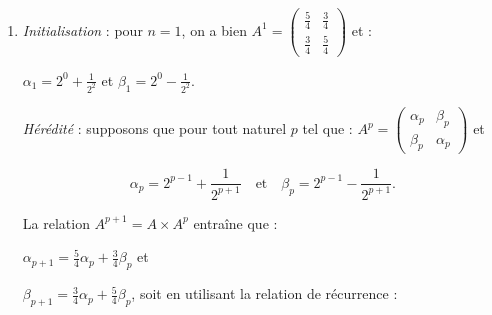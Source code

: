 \documentclass[10pt]{article}
\begin{document}
%
%
%
%

\begin{enumerate}
\item %

\emph{Initialisation} : pour $n = 1$, on a bien $A^1 = \begin{pmatrix}\frac{5}{4}&\frac{3}{4}\\\frac{3}{4}&\frac{5}{4} \end{pmatrix}$ et :

$\alpha_{1} = 2^0 + \frac{1}{2^2}$ et $\beta_{1} =  2^0 - \frac{1}{2^2}$.

\emph{Hérédité} : supposons que pour  tout  naturel $p$ tel que : $A^p = \begin{pmatrix}\alpha_{p}&\beta_{p}\\ \beta_{p}&\alpha_{p} \end{pmatrix}$ et 

\[\alpha_{p} = 2^{p-1}  + \dfrac{1}{2^{p+1}} \quad \text{et}\quad  \beta_{p} = 2^{p-1}  - \dfrac{1}{2^{p+1}}.\]

La relation $A^{p+1} = A \times A^p$ entraîne que :

$\alpha_{p+1} = \frac{5}{4}\alpha_{p} + \frac{3}{4}\beta_{p}$ et

$\beta_{p+1} = \frac{3}{4}\alpha_{p} + \frac{5}{4}\beta_{p}$, soit en utilisant la relation de récurrence :


\end{enumerate}
\end{document}
